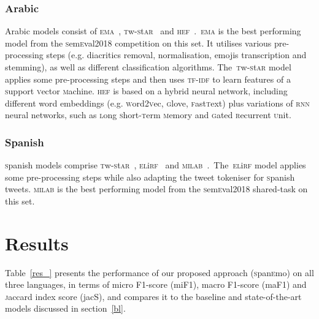 \documentclass[11pt,a4paper]{article}
\begin{document}
\subsubsection{Arabic}
Arabic models consist of \textsc{ema}~\cite{badaro-etal-2018-ema}, \textsc{t}w-\textsc{s}t\textsc{ar}~\cite{mulki-etal-2018-tw} and \textsc{hef}~\cite{alswaidan2020hybrid}.~\textsc{ema} is the best performing model from the \textsc{s}em\textsc{e}val2018 competition on this set. It utilises various pre-processing steps (e.g. diacritics removal, normalisation, emojis transcription and stemming), as well as different classification algorithms. The~\textsc{t}w-\textsc{s}t\textsc{ar} model applies some pre-processing steps and then uses \textsc{tf-idf} to learn features of a \textsc{s}upport \textsc{v}ector \textsc{m}achine. \textsc{hef} is based on a hybrid neural network, including different word embeddings (e.g. \textsc{w}ord2\textsc{v}ec, \textsc{g}love, \textsc{f}ast\textsc{t}ext) plus variations of \textsc{rnn} neural networks, such as \textsc{l}ong \textsc{s}hort-\textsc{t}erm \textsc{m}emory and \textsc{g}ated \textsc{r}ecurrent \textsc{u}nit.

\subsubsection{Spanish}
\textsc{s}panish models comprise \textsc{t}w-\textsc{s}t\textsc{ar}~\cite{mulki-etal-2018-tw}, \textsc{el}i\textsc{rf}~\cite{gonzalez-etal-2018-elirf} and \textsc{milab}~\cite{Mohammad2018semeval}.~The~\textsc{el}i\textsc{rf} model applies some pre-processing steps while also adapting the tweet tokeniser for \textsc{s}panish tweets. \textsc{milab} is the best performing model from the \textsc{s}em\textsc{e}val2018 shared-task on this set.  



\section{Results}\label{results_sec}
Table~\ref{res_} presents the performance of our proposed approach (\textsc{s}pan\textsc{e}mo) on all three languages, in terms of micro F1-score (miF1), macro F1-score (maF1) and \textsc{j}accard index score (jacS), and compares it to the baseline and state-of-the-art models discussed in section~\ref{bl}.
\end{document}
